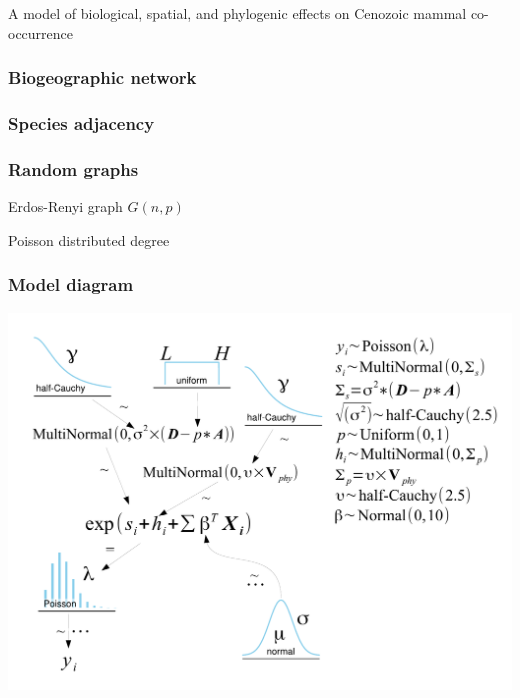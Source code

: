 \documentclass{beamer}
\begin{document}
\begin{frame}
  A model of biological, spatial, and phylogenic effects on Cenozoic mammal co-occurrence
\end{frame}

\begin{frame}
  \frametitle{Biogeographic network}
\end{frame}

\begin{frame}
  \frametitle{Species adjacency}
\end{frame}

\begin{frame}
  \frametitle{Random graphs}

  Erdos-Renyi graph \(G(n, p)\)

  Poisson distributed degree
\end{frame}

\begin{frame}
  \frametitle{Model diagram}
  \begin{center}
    \includegraphics[height = 0.8\textheight, width = \textwidth,  keepaspectratio = true]{figure/mammal_degree_model}
  \end{center}
\end{frame}

\end{document}
